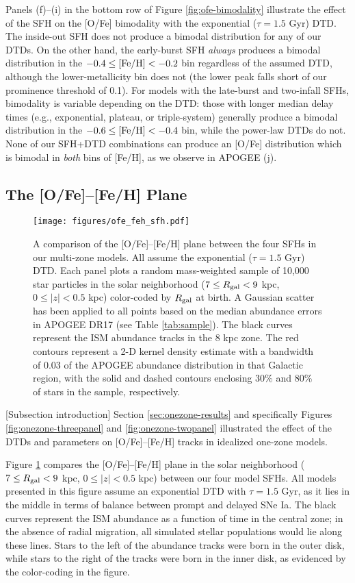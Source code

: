 \documentclass[twocolumn,twocolappendix,linenumbers,trackchanges]{aastex631}
\begin{document}
Panels (f)--(i) in the bottom row of Figure \ref{fig:ofe-bimodality} illustrate the effect of the SFH on the [O/Fe] bimodality with the exponential ($\tau=1.5$ Gyr) DTD. The inside-out SFH does not produce a bimodal distribution for any of our DTDs. On the other hand, the early-burst SFH {\it always} produces a bimodal distribution in the $-0.4\leq{\rm [Fe/H]}<-0.2$ bin regardless of the assumed DTD, although the lower-metallicity bin does not (the lower peak falls short of our prominence threshold of 0.1). For models with the late-burst and two-infall SFHs, bimodality is variable depending on the DTD: those with longer median delay times (e.g., exponential, plateau, or triple-system) generally produce a bimodal distribution in the $-0.6\leq{\rm [Fe/H]}<-0.4$ bin, while the power-law DTDs do not. None of our SFH+DTD combinations can produce an [O/Fe] distribution which is bimodal in {\it both} bins of [Fe/H], as we observe in APOGEE (j).

\subsection{The [O/Fe]--[Fe/H] Plane}
\label{sec:ofe-feh}

\begin{figure}
    \centering
    \texttt{[image: figures/ofe\_feh\_sfh.pdf]}
    \caption{A comparison of the [O/Fe]--[Fe/H] plane between the four SFHs in our multi-zone models. All assume the exponential ($\tau=1.5$ Gyr) DTD. Each panel plots a random mass-weighted sample of 10,000 star particles in the solar neighborhood ($7\leq R_{\rm gal}<9$ kpc, $0\leq|z|<0.5$ kpc) color-coded by $R_{\rm gal}$ at birth. A Gaussian scatter has been applied to all points based on the median abundance errors in APOGEE DR17 (see Table \ref{tab:sample}). The black curves represent the ISM abundance tracks in the 8 kpc zone. The red contours represent a 2-D kernel density estimate with a bandwidth of 0.03 of the APOGEE abundance distribution in that Galactic region, with the solid and dashed contours enclosing 30\% and 80\% of stars in the sample, respectively.}
    \label{fig:ofe-feh-sfh}
\end{figure}

[Subsection introduction]
Section \ref{sec:onezone-results} and specifically Figures \ref{fig:onezone-threepanel} and \ref{fig:onezone-twopanel} illustrated the effect of the DTDs and parameters on [O/Fe]--[Fe/H] tracks in idealized one-zone models.

Figure \ref{fig:ofe-feh-sfh} compares the [O/Fe]--[Fe/H] plane in the solar neighborhood ($7\leq R_{\rm gal}<9$ kpc, $0\leq|z|<0.5$ kpc) between our four model SFHs. All models presented in this figure assume an exponential DTD with $\tau=1.5$ Gyr, as it lies in the middle in terms of balance between prompt and delayed SNe Ia. The black curves represent the ISM abundance as a function of time in the central zone; in the absence of radial migration, all simulated stellar populations would lie along these lines. Stars to the left of the abundance tracks were born in the outer disk, while stars to the right of the tracks were born in the inner disk, as evidenced by the color-coding in the figure.
\end{document}
